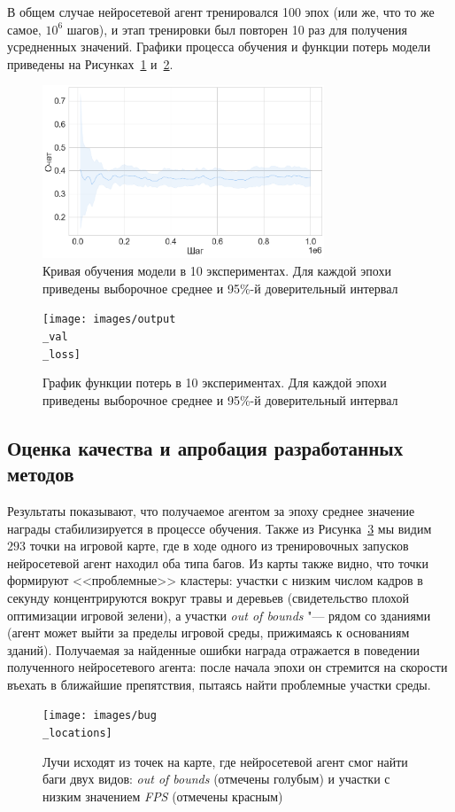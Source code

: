 В общем случае нейросетевой агент тренировался 100 эпох (или же, что то же самое, \(10^6\) шагов), и этап тренировки был повторен 10 раз для получения усредненных значений. Графики процесса обучения и функции потерь модели приведены на Рисунках~\ref{fig:training} и~\ref{fig:trainingValueLoss}. 

\begin{figure}
	\centering
	\includegraphics[width=0.75\textwidth]{images/output}
	\caption{Кривая обучения модели в 10 экспериментах. Для каждой эпохи приведены выборочное среднее и 95\%-й доверительный интервал}
	\label{fig:training}
\end{figure}

\begin{figure}
	\centering
	\texttt{[image: images/output\\\_val\\\_loss]}
	\caption{График функции потерь в 10 экспериментах. Для каждой эпохи приведены выборочное среднее и 95\%-й доверительный интервал}
	\label{fig:trainingValueLoss}
\end{figure}

\subsection{Оценка качества и апробация разработанных методов}
Результаты показывают, что получаемое агентом за эпоху среднее значение награды стабилизируется в процессе обучения. Также из Рисунка~\ref{fig:bugLocations} мы видим \(293\) точки на игровой карте, где в ходе одного из тренировочных запусков нейросетевой агент находил оба типа багов. Из карты также видно, что точки формируют <<проблемные>> кластеры: участки с низким числом кадров в секунду концентрируются вокруг травы и деревьев (свидетельство плохой оптимизации игровой зелени), а участки \textit{out of bounds} "--- рядом со зданиями (агент может выйти за пределы игровой среды, прижимаясь к основаниям зданий). Получаемая за найденные ошибки награда отражается в поведении полученного нейросетевого агента: после начала эпохи он стремится на скорости въехать в ближайшие препятствия, пытаясь найти проблемные участки среды.

\begin{figure}
	\centering
	\texttt{[image: images/bug\\\_locations]}
	\caption{Лучи исходят из точек на карте, где нейросетевой агент смог найти баги двух видов: \textit{out of bounds} (отмечены голубым) и участки с низким значением \textit{FPS} (отмечены красным)}
	\label{fig:bugLocations}
\end{figure}

